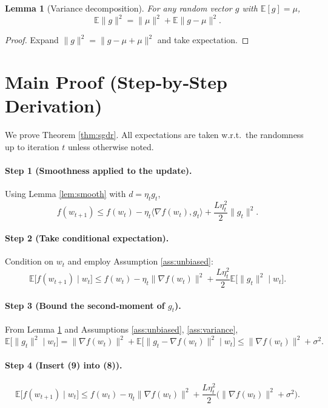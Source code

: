 \documentclass{article}
\newtheorem{lemma}{Lemma}
\newcommand{\E}{\mathbb{E}}
\begin{document}
\begin{lemma}[Variance decomposition]\label{lem:var}
For any random vector $g$ with $\E[g]=\mu$,
\[
    \E\|g\|^{2}= \|\mu\|^{2}+ \E\|g-\mu\|^{2}.
\tag{6}
\]
\end{lemma}
\begin{proof}
Expand $\|g\|^{2}=\|g-\mu+\mu\|^{2}$ and take expectation.
\end{proof}

\section*{Main Proof (Step‑by‑Step Derivation)}
We prove Theorem \ref{thm:sgdr}.  All expectations are taken w.r.t.\ the randomness up to iteration $t$ unless otherwise noted.

\paragraph{Step 1 (Smoothness applied to the update).}
Using Lemma \ref{lem:smooth} with $d=\eta_t g_t$,
\[
f(w_{t+1})
\le f(w_t)-\eta_t\langle\nabla f(w_t),g_t\rangle
     +\frac{L\eta_t^{2}}{2}\|g_t\|^{2}.
\tag{7}
\]

\paragraph{Step 2 (Take conditional expectation).}
Condition on $w_t$ and employ Assumption \ref{ass:unbiased}:
\[
\E\!\bigl[f(w_{t+1})\mid w_t\bigr]
\le f(w_t)-\eta_t\|\nabla f(w_t)\|^{2}
     +\frac{L\eta_t^{2}}{2}\E\!\bigl[\|g_t\|^{2}\mid w_t\bigr].
\tag{8}
\]

\paragraph{Step 3 (Bound the second‑moment of $g_t$).}
From Lemma \ref{lem:var} and Assumptions \ref{ass:unbiased}, \ref{ass:variance},
\[
\E\!\bigl[\|g_t\|^{2}\mid w_t\bigr]
= \|\nabla f(w_t)\|^{2}+ \E\!\bigl[\|g_t-\nabla f(w_t)\|^{2}\mid w_t\bigr]
\le \|\nabla f(w_t)\|^{2}+ \sigma^{2}.
\tag{9}
\]

\paragraph{Step 4 (Insert (9) into (8)).}
\[
\E\!\bigl[f(w_{t+1})\mid w_t\bigr]
\le f(w_t)-\eta_t\|\nabla f(w_t)\|^{2}
   +\frac{L\eta_t^{2}}{2}\bigl(\|\nabla f(w_t)\|^{2}+\sigma^{2}\bigr).
\tag{10}
\]
\end{document}
